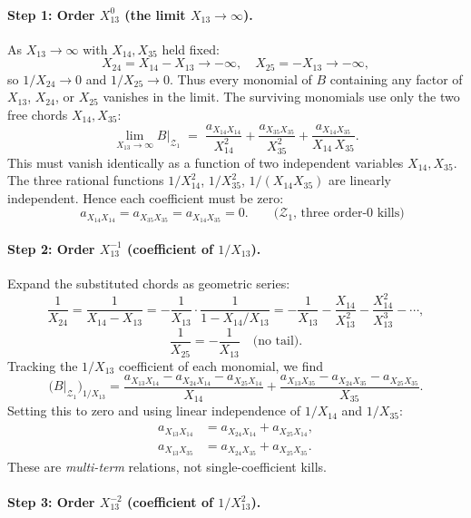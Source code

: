 \documentclass[11pt]{article}
\newcommand{\X}[2]{X_{#1#2}}
\newcommand{\Z}{\mathcal{Z}}
\theoremstyle{definition}
\begin{document}
\paragraph{Step 1: Order $\X{1}{3}^0$ (the limit $\X{1}{3}\to\infty$).}

As $\X{1}{3}\to\infty$ with $\X{1}{4},\X{3}{5}$ held fixed:
\[
\X{2}{4}=\X{1}{4}-\X{1}{3}\to-\infty,\quad \X{2}{5}=-\X{1}{3}\to-\infty,
\]
so $1/\X{2}{4}\to 0$ and $1/\X{2}{5}\to 0$. Thus every monomial of $B$
containing any factor of $\X{1}{3}$, $\X{2}{4}$, or $\X{2}{5}$ vanishes in
the limit. The surviving monomials use only the two free chords $\X{1}{4},\X{3}{5}$:
\[
\lim_{\X{1}{3}\to\infty} B|_{\Z_1}
\;=\;
\frac{a_{\X{1}{4}\X{1}{4}}}{\X{1}{4}^2} +
\frac{a_{\X{3}{5}\X{3}{5}}}{\X{3}{5}^2} +
\frac{a_{\X{1}{4}\X{3}{5}}}{\X{1}{4}\,\X{3}{5}}.
\]
This must vanish identically as a function of two independent variables
$\X{1}{4},\X{3}{5}$. The three rational functions $1/\X{1}{4}^2$, $1/\X{3}{5}^2$,
$1/(\X{1}{4}\X{3}{5})$ are linearly independent. Hence each coefficient must be zero:
\[
\boxed{\quad a_{\X{1}{4}\X{1}{4}}=a_{\X{3}{5}\X{3}{5}}=a_{\X{1}{4}\X{3}{5}}=0.\quad}
\quad\text{($\Z_1$, three order-0 kills)}
\]

\paragraph{Step 2: Order $\X{1}{3}^{-1}$ (coefficient of $1/\X{1}{3}$).}

Expand the substituted chords as geometric series:
\[
\frac{1}{\X{2}{4}}
=\frac{1}{\X{1}{4}-\X{1}{3}}
=-\frac{1}{\X{1}{3}}\cdot\frac{1}{1-\X{1}{4}/\X{1}{3}}
=-\frac{1}{\X{1}{3}}-\frac{\X{1}{4}}{\X{1}{3}^2}-\frac{\X{1}{4}^2}{\X{1}{3}^3}-\cdots,
\]
\[
\frac{1}{\X{2}{5}}=-\frac{1}{\X{1}{3}}\quad\text{(no tail).}
\]
Tracking the $1/\X{1}{3}$ coefficient of each monomial, we find
\[
\bigl(B|_{\Z_1}\bigr)_{1/\X{1}{3}}
=
\frac{a_{\X{1}{3}\X{1}{4}}-a_{\X{2}{4}\X{1}{4}}-a_{\X{2}{5}\X{1}{4}}}{\X{1}{4}}
+\frac{a_{\X{1}{3}\X{3}{5}}-a_{\X{2}{4}\X{3}{5}}-a_{\X{2}{5}\X{3}{5}}}{\X{3}{5}}.
\]
Setting this to zero and using linear independence of $1/\X{1}{4}$ and
$1/\X{3}{5}$:
\begin{align*}
a_{\X{1}{3}\X{1}{4}}&=a_{\X{2}{4}\X{1}{4}}+a_{\X{2}{5}\X{1}{4}},\\
a_{\X{1}{3}\X{3}{5}}&=a_{\X{2}{4}\X{3}{5}}+a_{\X{2}{5}\X{3}{5}}.
\end{align*}
These are \emph{multi-term} relations, not single-coefficient kills.

\paragraph{Step 3: Order $\X{1}{3}^{-2}$ (coefficient of $1/\X{1}{3}^2$).}
\end{document}
